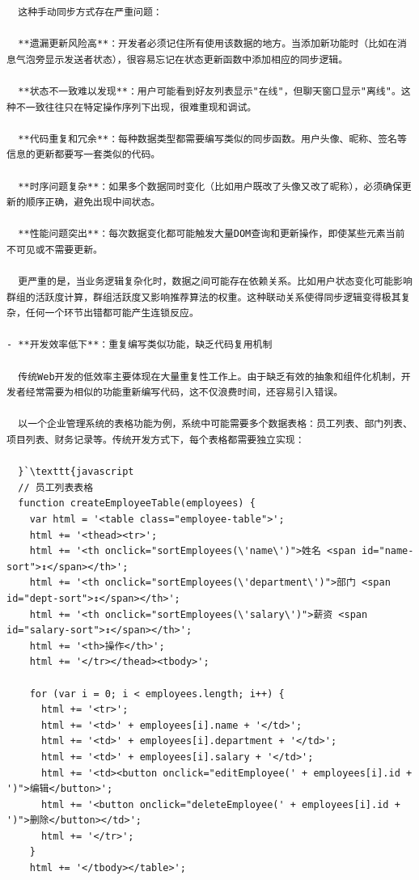 {{\begin{lstlisting}
  这种手动同步方式存在严重问题：

  **遗漏更新风险高**：开发者必须记住所有使用该数据的地方。当添加新功能时（比如在消息气泡旁显示发送者状态），很容易忘记在状态更新函数中添加相应的同步逻辑。

  **状态不一致难以发现**：用户可能看到好友列表显示"在线"，但聊天窗口显示"离线"。这种不一致往往只在特定操作序列下出现，很难重现和调试。

  **代码重复和冗余**：每种数据类型都需要编写类似的同步函数。用户头像、昵称、签名等信息的更新都要写一套类似的代码。

  **时序问题复杂**：如果多个数据同时变化（比如用户既改了头像又改了昵称），必须确保更新的顺序正确，避免出现中间状态。

  **性能问题突出**：每次数据变化都可能触发大量DOM查询和更新操作，即使某些元素当前不可见或不需要更新。

  更严重的是，当业务逻辑复杂化时，数据之间可能存在依赖关系。比如用户状态变化可能影响群组的活跃度计算，群组活跃度又影响推荐算法的权重。这种联动关系使得同步逻辑变得极其复杂，任何一个环节出错都可能产生连锁反应。

- **开发效率低下**：重复编写类似功能，缺乏代码复用机制

  传统Web开发的低效率主要体现在大量重复性工作上。由于缺乏有效的抽象和组件化机制，开发者经常需要为相似的功能重新编写代码，这不仅浪费时间，还容易引入错误。

  以一个企业管理系统的表格功能为例，系统中可能需要多个数据表格：员工列表、部门列表、项目列表、财务记录等。传统开发方式下，每个表格都需要独立实现：

  }`\texttt{javascript
  // 员工列表表格
  function createEmployeeTable(employees) {
    var html = '<table class="employee-table">';
    html += '<thead><tr>';
    html += '<th onclick="sortEmployees(\'name\')">姓名 <span id="name-sort">↕</span></th>';
    html += '<th onclick="sortEmployees(\'department\')">部门 <span id="dept-sort">↕</span></th>';
    html += '<th onclick="sortEmployees(\'salary\')">薪资 <span id="salary-sort">↕</span></th>';
    html += '<th>操作</th>';
    html += '</tr></thead><tbody>';
    
    for (var i = 0; i < employees.length; i++) {
      html += '<tr>';
      html += '<td>' + employees[i].name + '</td>';
      html += '<td>' + employees[i].department + '</td>';
      html += '<td>' + employees[i].salary + '</td>';
      html += '<td><button onclick="editEmployee(' + employees[i].id + ')">编辑</button>';
      html += '<button onclick="deleteEmployee(' + employees[i].id + ')">删除</button></td>';
      html += '</tr>';
    }
    html += '</tbody></table>';
    

\end{lstlisting}}}
